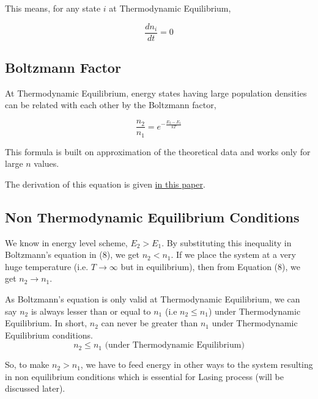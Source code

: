 \documentclass[12pt]{article}
\begin{document}
This means, for any state $i$ at Thermodynamic Equilibrium, 

\begin{equation}
    \frac{dn_{i}}{dt} = 0
\end{equation}

\subsection{Boltzmann Factor}

At Thermodynamic Equilibrium, energy states having large population densities can be related with each other by the Boltzmann factor,

\begin{equation}
    \frac{n_{2}}{n_{1}} = e^{-\frac{E_{2} - E_{1}}{kT}}
\end{equation}

This formula is built on approximation of the theoretical data and works only for large $n$ values. \vspace{.2cm}

The derivation of this equation is given \href{https://www.phys.ufl.edu/~meisel/Boltzmann.pdf}{in this paper}.

\subsection{Non Thermodynamic Equilibrium Conditions}

We know in energy level scheme, $E_{2} > E_{1}$. By substituting this inequality in Boltzmann's equation in (8), we get $n_{2} < n_{1}$. If we place the system at a very huge temperature (i.e. $T \rightarrow \infty$ but in equilibrium), then from Equation (8), we get $n_{2} \rightarrow n_{1}$. \vspace{.2cm}

As Boltzmann's equation is only valid at Thermodynamic Equilibrium, we can say $n_{2}$ is always lesser than or equal to $n_{1}$ (i.e $n_{2} \le n_{1}$) under Thermodynamic Equilibrium. In short, $n_{2}$ can never be greater than $n_{1}$ under Thermodynamic Equilibrium conditions. 
\begin{equation*}
    n_{2} \le n_{1} \text{ (under Thermodynamic Equilibrium)}
\end{equation*}

So, to make $n_{2} > n_{1}$, we have to feed energy in other ways to the system resulting in non equilibrium conditions which is essential for Lasing process (will be discussed later). 
\end{document}
